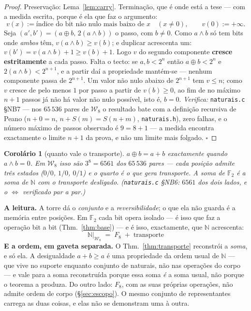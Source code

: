\documentclass[11pt,a4paper]{article}
\newtheorem{corolario}[teorema]{Corolário}
\newcommand{\code}[1]{\texttt{\small #1}}
\newcommand{\Word}{\mathcal{W}}
\newcommand{\FF}{\mathbb{F}}
\begin{document}
\begin{proof}
Preservação: Lema~\ref{lem:carry}. Terminação, que é onde está a tese ---
com a medida escrita, porque é ela que faz o argumento:
\[
v(x):=\text{índice do bit não nulo mais baixo de }x\quad(x\neq0),
\qquad v(0):=+\infty .
\]
Seja $(a',b')=(a\oplus b,\,2(a\wedge b))$ o passo, com $b\neq0$. Como
$a\wedge b$ só tem bits onde \emph{ambos} têm, $v(a\wedge b)\ge v(b)$; e
duplicar acrescenta um: $v(b')=v(a\wedge b)+1\ge v(b)+1$. Logo $v$ do segundo
componente \textbf{cresce estritamente} a cada passo. Falta o tecto: se
$a,b<2^{n}$ então $a\oplus b<2^{n}$ e $2(a\wedge b)<2^{n+1}$, e a partir daí a
propriedade mantém-se --- nenhum componente passa de $2^{n+1}$. Um valor não
nulo abaixo de $2^{n+1}$ tem $v\le n$; como $v$ cresce de pelo menos $1$ por
passo a partir de $v(b)\ge0$, ao fim de no máximo $n+1$ passos já não há valor
não nulo possível, isto é, $b=0$.
\emph{Verifica:} \code{naturais.c} §NB7 --- nos $65\,536$ pares de $\Word_8$
o resultado bate com a definição recursiva de Peano
($n+0=n$, $n+S(m)=S(n+m)$, \code{naturais.h}), zero falhas, e o número máximo
de passos observado é $9=8+1$ --- a medida encontra exactamente o limite
$n+1$ da prova, e não um limite mais folgado.
$\square$
\end{proof}

\begin{corolario}[quanto vale o transporte]\label{cor:3n}
$a\oplus b=a+b$ exactamente quando $a\wedge b=0$. Em $\Word_8$ isso são
$3^{8}=6561$ dos $65\,536$ pares --- cada posição admite três estados
($0/0$, $1/0$, $0/1$) e o quarto é o que gera transporte.
\emph{A soma de $\FF_2$ é a soma de $\mathbb{N}$ com o transporte desligado.}
(\code{naturais.c} §NB6: $6561$ dos dois lados, e o $\iff$ verificado par a par.)
\end{corolario}

\medskip\noindent\textbf{A leitura.} A torre dá o \emph{conjunto} e a
\emph{reversibilidade}; o que ela não guarda é a memória entre posições. Em
$\FF_2$ cada bit opera isolado --- é isso que faz a operação bit a bit
(Thm.~\ref{thm:base}) --- e é isso, exactamente, que $\mathbb{N}$ acrescenta:
\[
\boxed{\;\mathbb{N}\big|_{\Word_8}\;=\;F_8\;+\;\text{transporte}\;}
\]
\medskip\noindent\textbf{E a ordem, em gaveta separada.} O
Thm.~\ref{thm:transporte} reconstrói a \emph{soma}, e só ela. A desigualdade
$a+b\ge a$ é uma propriedade da ordem usual de $\mathbb{N}$ --- que vive no
suporte enquanto conjunto de naturais, não nas operações do corpo --- e vale
para a soma reconstruída porque essa soma \emph{é} a soma usual, não porque o
teorema a produza. Do outro lado: $F_8$, com as suas próprias operações, não
admite ordem de corpo (§\ref{sec:escopo}). O mesmo conjunto de representantes
carrega as duas coisas, e elas não se demonstram uma à outra.
\end{document}
